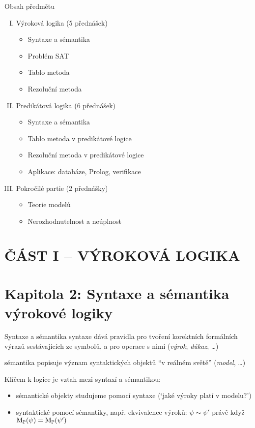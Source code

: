\documentclass{beamer}
\begin{document}
\begin{frame}{Obsah předmětu}

    \begin{enumerate}[I.]
        \item Výroková logika (5 přednášek)
        \begin{itemize}
            \item Syntaxe a sémantika
            \item Problém SAT
            \item Tablo metoda
            \item Rezoluční metoda
        \end{itemize}
        \item Predikátová logika (6 přednášek)
        \begin{itemize}
            \item Syntaxe a sémantika
            \item Tablo metoda v predikátové logice
            \item Rezoluční metoda v predikátové logice
            \item Aplikace: databáze, Prolog, verifikace
        \end{itemize}
        \item Pokročilé partie (2 přednášky)
        \begin{itemize}
            \item Teorie modelů
            \item Nerozhodnutelnost a neúplnost
        \end{itemize}
    \end{enumerate}    

\end{frame}


\section*{ČÁST I -- VÝROKOVÁ LOGIKA}


\section{\sc Kapitola 2: Syntaxe a sémantika výrokové logiky}


\begin{frame}{Syntaxe a sémantika}
    \alert{syntaxe} dává pravidla pro tvoření korektních formálních výrazů sestávajících ze symbolů, a pro operace s nimi (\emph{výrok}, \emph{důkaz}, \dots)
    
    \alert{sémantika} popisuje význam syntaktických objektů ``v reálném světě'' (\emph{model}, \dots)
        
    Klíčem k logice je vztah mezi syntaxí a sémantikou:
    \begin{itemize}
        \item sémantické objekty studujeme pomocí syntaxe (`jaké výroky  platí v modelu?')
        \item syntaktické pomocí sémantiky, např. ekvivalence výroků: $\psi \sim \psi'$ právě když $\operatorname{M}_\mathbb P(\psi)=\operatorname{M}_\mathbb P(\psi')$
    \end{itemize}
\end{frame}
\end{document}

